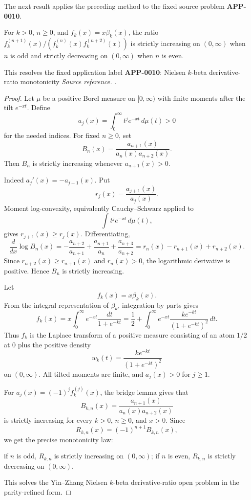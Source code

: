 The next result applies the preceding method to the fixed source problem \textbf{APP-0010}.
\begin{corollary}
\label{res:nielsen-k-beta-derivative-ratio-monotonicity}
For \(k>0\), \(n\ge0\), and \(f_k(x)=x\beta_k(x)\), the ratio \(f_k^{(n+1)}(x)/(f_k^{(n)}(x)f_k^{(n+2)}(x))\) is strictly increasing on \((0,\infty)\) when \(n\) is odd and strictly decreasing on \((0,\infty)\) when \(n\) is even.

This resolves the fixed application label \textbf{APP-0010}: Nielsen \(k\)-beta derivative-ratio monotonicity
\emph{Source reference.} \cite{app-app-0010-source}.
\end{corollary}
\begin{proof}
Let \(\mu\) be a positive Borel measure on \([0,\infty)\) with finite moments after the tilt \(e^{-xt}\). Define
\[
a_j(x)=\int_0^\infty t^j e^{-xt}\,d\mu(t)>0
\]
for the needed indices. For fixed \(n\ge0\), set
\[
B_n(x)=\frac{a_{n+1}(x)}{a_n(x)a_{n+2}(x)}.
\]
Then \(B_n\) is strictly increasing whenever \(a_{n+1}(x)>0\).

Indeed \(a_j'(x)=-a_{j+1}(x)\). Put
\[
r_j(x)=\frac{a_{j+1}(x)}{a_j(x)}.
\]
Moment log-convexity, equivalently Cauchy--Schwarz applied to
\[
\int t^j e^{-xt}\,d\mu(t),
\]
gives \(r_{j+1}(x)\ge r_j(x)\). Differentiating,
\[
\frac{d}{dx}\log B_n(x)
=-\frac{a_{n+2}}{a_{n+1}}
+\frac{a_{n+1}}{a_n}
+\frac{a_{n+3}}{a_{n+2}}
=r_n(x)-r_{n+1}(x)+r_{n+2}(x).
\]
Since \(r_{n+2}(x)\ge r_{n+1}(x)\) and \(r_n(x)>0\), the logarithmic derivative is positive. Hence \(B_n\) is strictly increasing.

Let
\[
f_k(x)=x\beta_k(x).
\]
From the integral representation of \(\beta_k\), integration by parts gives
\[
f_k(x)
=x\int_0^\infty e^{-xt}\frac{dt}{1+e^{-kt}}
=\frac12+\int_0^\infty e^{-xt}\frac{k e^{-kt}}{(1+e^{-kt})^2}\,dt.
\]
Thus \(f_k\) is the Laplace transform of a positive measure consisting of an atom \(1/2\) at \(0\) plus the positive density
\[
w_k(t)=\frac{k e^{-kt}}{(1+e^{-kt})^2}
\]
on \((0,\infty)\). All tilted moments are finite, and \(a_{j}(x)>0\) for \(j\ge1\).

For \(a_j(x)=(-1)^j f_k^{(j)}(x)\), the bridge lemma gives that
\[
B_{k,n}(x)=\frac{a_{n+1}(x)}{a_n(x)a_{n+2}(x)}
\]
is strictly increasing for every \(k>0\), \(n\ge0\), and \(x>0\). Since
\[
R_{k,n}(x)=(-1)^{n+1}B_{k,n}(x),
\]
we get the precise monotonicity law:

if \(n\) is odd, \(R_{k,n}\) is strictly increasing on \((0,\infty)\);
if \(n\) is even, \(R_{k,n}\) is strictly decreasing on \((0,\infty)\).

This solves the Yin--Zhang Nielsen \(k\)-beta derivative-ratio open problem in the parity-refined form.
\end{proof}

